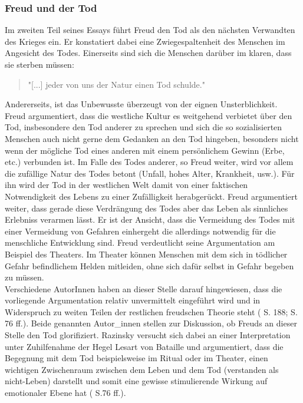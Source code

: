 \documentclass[11pt,a4paper,oneside,numbers=noenddot,bibliography=totocnumbered,DIV=13]{scrartcl}
\begin{document}
{\subsubsection{Freud und der Tod}
  Im zweiten Teil seines Essays führt Freud den Tod als den nächsten Verwandten des Krieges ein. Er konstatiert dabei eine Zwiegespaltenheit des Menschen im Angesicht des Todes. Einerseits sind sich die Menschen darüber im klaren, dass sie sterben müssen:
\begin{quote} "[...] jeder von uns der Natur einen Tod schulde."
\end{quote}
Andererseits, ist das Unbewusste überzeugt von der eignen Unsterblichkeit.\\
Freud argumentiert, dass die westliche Kultur es weitgehend verbietet über den Tod, insbesondere den Tod anderer zu sprechen und sich die so sozialisierten Menschen auch nicht gerne dem Gedanken an den Tod hingeben, besonders nicht wenn der mögliche Tod eines anderen mit einem persönlichem Gewinn (Erbe, etc.) verbunden ist. Im Falle des Todes anderer, so Freud weiter, wird vor allem die zufällige Natur des Todes betont (Unfall, hohes Alter, Krankheit, usw.). Für ihn wird der Tod in der westlichen Welt damit von einer faktischen Notwendigkeit des Lebens zu einer Zufälligkeit herabgerückt.
Freud argumentiert weiter, dass gerade diese Verdrängung des Todes aber das Leben als sinnliches Erlebniss verarmen lässt. Er ist der Ansicht, dass die Vermeidung des Todes mit einer Vermeidung von Gefahren einhergeht die allerdings notwendig für die menschliche Entwicklung sind. Freud verdeutlicht seine Argumentation am Beispiel des Theaters. Im Theater können Menschen mit dem sich in tödlicher Gefahr befindlichem Helden mitleiden, ohne sich dafür selbst in Gefahr begeben zu müssen. \\
Verschiedene AutorInnen haben an dieser Stelle darauf hingewiesen, dass die vorliegende Argumentation relativ unvermittelt eingeführt wird und in Widerspruch zu weiten Teilen der restlichen freudschen Theorie steht (\cite{lohmann_freud-handbuch:_2013} S. 188; \cite{liran_razinsky_how_2009} S. 76 ff.).  Beide genannten Autor\_innen stellen zur Diskussion, ob Freuds an dieser Stelle den Tod glorifiziert. Razinsky versucht sich dabei an einer Interpretation unter Zuhilfenahme der Hegel Lesart von Bataille und argumentiert, dass die Begegnung mit dem Tod beispielsweise im Ritual oder im Theater, einen wichtigen Zwischenraum zwischen dem Leben und dem Tod (verstanden als nicht-Leben) darstellt und somit eine gewisse stimulierende Wirkung auf emotionaler Ebene hat (\cite{liran_razinsky_how_2009} S.76 ff.).\\
}
\end{document}

